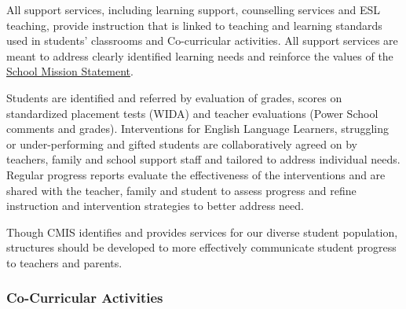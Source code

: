 

\begin{findings}
All support services, including learning support, counselling services and ESL teaching, provide instruction that is linked to teaching and learning standards used in students’ classrooms and Co-curricular activities. All support services are meant to address clearly identified learning needs and reinforce the values of the \href{http://cmis.ac.th/about/vision}{School Mission Statement}. 

Students are identified and referred by evaluation of grades, scores on standardized placement tests (WIDA) and teacher evaluations (Power School comments and grades).  Interventions for English Language Learners, struggling or under-performing and gifted students are collaboratively agreed on by teachers, family and school support staff and tailored to address individual needs. Regular progress reports evaluate the effectiveness of the interventions and are shared with the teacher, family and student to assess progress and refine instruction and intervention strategies to better address need.


Though CMIS identifies and provides services for our diverse student population, structures should be developed to more effectively communicate student progress to teachers and parents. 
\end{findings}

\subsubsection{Co-Curricular Activities}


